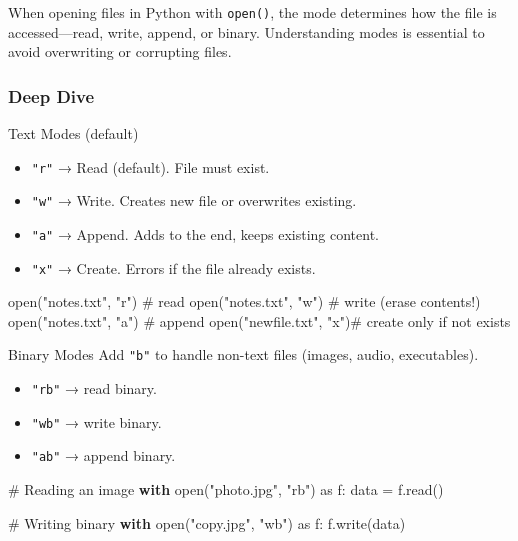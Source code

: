 \documentclass[
  letterpaper,
  DIV=11,
  numbers=noendperiod]{scrreprt}
\newenvironment{Shaded}{\begin{snugshade}}{\end{snugshade}}
\newcommand{\BuiltInTok}[1]{\textcolor[rgb]{0.00,0.23,0.31}{#1}}
\newcommand{\CommentTok}[1]{\textcolor[rgb]{0.37,0.37,0.37}{#1}}
\newcommand{\ControlFlowTok}[1]{\textcolor[rgb]{0.00,0.23,0.31}{\textbf{#1}}}
\newcommand{\ImportTok}[1]{\textcolor[rgb]{0.00,0.46,0.62}{#1}}
\newcommand{\NormalTok}[1]{\textcolor[rgb]{0.00,0.23,0.31}{#1}}
\newcommand{\OperatorTok}[1]{\textcolor[rgb]{0.37,0.37,0.37}{#1}}
\newcommand{\StringTok}[1]{\textcolor[rgb]{0.13,0.47,0.30}{#1}}
\providecommand{\tightlist}{%
  \setlength{\itemsep}{0pt}\setlength{\parskip}{0pt}}
\begin{document}
When opening files in Python with \texttt{open()}, the mode determines
how the file is accessed---read, write, append, or binary. Understanding
modes is essential to avoid overwriting or corrupting files.

\subsubsection{Deep Dive}\label{deep-dive-53}

Text Modes (default)

\begin{itemize}
\tightlist
\item
  \texttt{"r"} → Read (default). File must exist.
\item
  \texttt{"w"} → Write. Creates new file or overwrites existing.
\item
  \texttt{"a"} → Append. Adds to the end, keeps existing content.
\item
  \texttt{"x"} → Create. Errors if the file already exists.
\end{itemize}

\begin{Shaded}
\begin{Highlighting}[]
\BuiltInTok{open}\NormalTok{(}\StringTok{"notes.txt"}\NormalTok{, }\StringTok{"r"}\NormalTok{)  }\CommentTok{\# read}
\BuiltInTok{open}\NormalTok{(}\StringTok{"notes.txt"}\NormalTok{, }\StringTok{"w"}\NormalTok{)  }\CommentTok{\# write (erase contents!)}
\BuiltInTok{open}\NormalTok{(}\StringTok{"notes.txt"}\NormalTok{, }\StringTok{"a"}\NormalTok{)  }\CommentTok{\# append}
\BuiltInTok{open}\NormalTok{(}\StringTok{"newfile.txt"}\NormalTok{, }\StringTok{"x"}\NormalTok{)}\CommentTok{\# create only if not exists}
\end{Highlighting}
\end{Shaded}

Binary Modes Add \texttt{"b"} to handle non-text files (images, audio,
executables).

\begin{itemize}
\tightlist
\item
  \texttt{"rb"} → read binary.
\item
  \texttt{"wb"} → write binary.
\item
  \texttt{"ab"} → append binary.
\end{itemize}

\begin{Shaded}
\begin{Highlighting}[]
\CommentTok{\# Reading an image}
\ControlFlowTok{with} \BuiltInTok{open}\NormalTok{(}\StringTok{"photo.jpg"}\NormalTok{, }\StringTok{"rb"}\NormalTok{) }\ImportTok{as}\NormalTok{ f:}
\NormalTok{    data }\OperatorTok{=}\NormalTok{ f.read()}

\CommentTok{\# Writing binary}
\ControlFlowTok{with} \BuiltInTok{open}\NormalTok{(}\StringTok{"copy.jpg"}\NormalTok{, }\StringTok{"wb"}\NormalTok{) }\ImportTok{as}\NormalTok{ f:}
\NormalTok{    f.write(data)}
\end{Highlighting}
\end{Shaded}
\end{document}
